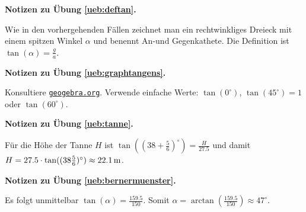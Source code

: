 \documentclass[%
11pt,%
twoside,%
titlepage,%
german,%
headsepline%
]{scrartcl}
\newcommand{\geogebralink}{\href{https://www.geogebra.org/calculator}{\texttt{geogebra.org}}}
\newcommand{\concatueb}[1]{ueb:#1}%
\newcommand{\concatlsg}[1]{lsg:#1}%
\newenvironment{lsg}[1]{%
    \par\noindent\textbf{Notizen zu Übung \ref{\concatueb{#1}}.}%
    \label{\concatlsg{#1}}
}{%
    \par%
}
\begin{document}
\begin{lsg}{deftan}
Wie in den vorhergehenden F\"allen zeichnet man ein rechtwinkliges Dreieck mit einem spitzen Winkel $\alpha$ und benennt An-und Gegenkathete. Die Definition ist $\tan(\alpha)=\frac{g}{a}$.
\end{lsg}

\begin{lsg}{graphtangens}
Konsultiere \geogebralink. Verwende einfache Werte: $\tan(0^{\circ})$, $\tan(45^{\circ})=1$ oder $\tan(60^{\circ})$.
\end{lsg}

\begin{lsg}{tanne}
F\"ur die H\"ohe der Tanne $H$ ist $\tan( (38+\frac{5}{6})^\circ)=\frac{H}{27.5}$ und damit $H=27.5\cdot \tan( (38\frac{5}{6})^\circ)\approx\unit[22.1]{m}$.
\end{lsg}

\begin{lsg}{bernermuenster}
Es folgt unmittelbar $\tan(\alpha)=\frac{159.5}{150}$. Somit $\alpha=\arctan(\frac{159.5}{150})\approx47^{\circ}$.
\end{lsg}
\end{document}
